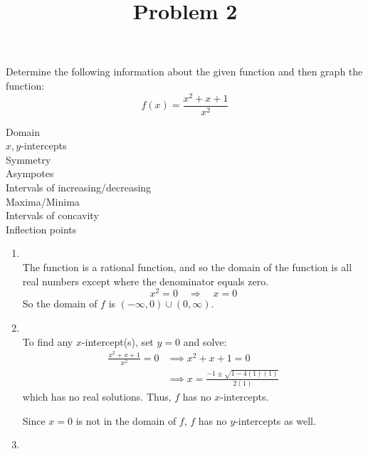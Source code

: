 \documentclass{ximera}
\title[Problem 2]{Problem 2}
\begin{document}
\begin{abstract} \end{abstract}
\maketitle


\begin{problem}

  Determine the following information about the given function and then graph the function:
  \[ 
    f(x) = \frac{x^2 + x + 1}{x^2}
  \]
  
  Domain\\
  $x,y$-intercepts\\
  Symmetry\\
  Asympotes\\
  Intervals of increasing/decreasing\\
  Maxima/Minima\\
  Intervals of concavity\\
  Inflection points
\begin{explanation}
    \mbox{}
    \begin{enumerate}
      \item  
          \\
        
        The function is a rational function, and so the domain of the function is all real numbers except where the denominator equals zero.
        \[
          x^2 = 0 \quad \Longrightarrow \quad x=0
        \]
	So the domain of $f$ is $(-\infty ,0)\cup (0,\infty )$.


      \item
          \\
        To find any $x$-intercept(s), set $y=0$ and solve:
        \begin{align*}
          \frac{x^2 + x + 1}{x^2} = 0 &\implies x^2 + x + 1 = 0 \\
          &\implies x = \frac{-1 \pm \sqrt{1-4(1)(1)}}{2(1)}
        \end{align*}
	which has no real solutions.
        Thus, $f$ has no $x$-intercepts.
			
	Since $x=0$ is not in the domain of $f$, $f$ has no $y$-intercepts as well.
 
     \item 
         \\


\end{enumerate}
\end{explanation}
\end{problem}
\end{document}
